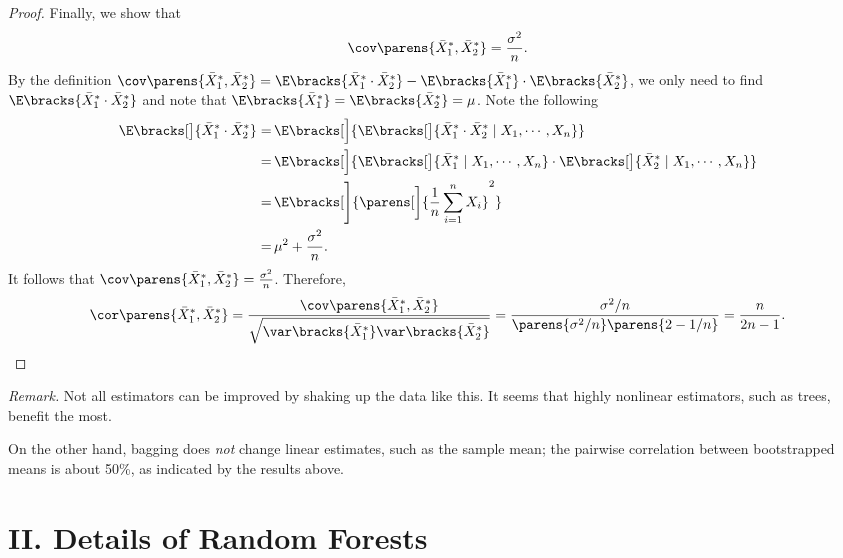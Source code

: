 \documentclass[12pt]{article}
\begin{document}
\begin{enumerate}[label=\textbf{\arabic*.}]
\begin{proof}
	Finally, we show that 
	\begin{align*}
		\cov \parens{\bar{X}^*_1, \bar{X}^*_2} = \frac{\sigma^2}{n}. 
	\end{align*}
	By the definition $\cov \parens{\bar{X}^*_1, \bar{X}^*_2} = \E \bracks{\bar{X}^*_1 \cdot \bar{X}^*_2} - \E \bracks{\bar{X}^*_1} \cdot \E \bracks{\bar{X}^*_2}$, we only need to find $\E \bracks{\bar{X}^*_1 \cdot \bar{X}^*_2}$ and note that $\E \bracks{\bar{X}^*_1} = \E \bracks{\bar{X}^*_2} = \mu$. Note the following 
	\begin{align*}
		\E \bracks[\big]{\bar{X}^*_1 \cdot \bar{X}^*_2} = & \, \E \bracks[\Big]{\E \bracks[\big]{\bar{X}^*_1 \cdot \bar{X}^*_2 \mid X_1, \cdots, X_n}} \\ 
		= & \, \E \bracks[\Big]{\E \bracks[\big]{\bar{X}^*_1 \mid X_1, \cdots, X_n} \cdot \E \bracks[\big]{\bar{X}^*_2 \mid X_1, \cdots, X_n}} \\ 
		= & \, \E \bracks[\Bigg]{\parens[\bigg]{\frac{1}{n}\sum_{i=1}^n X_i}^2} \\ 
		= & \, \mu^2 + \frac{\sigma^2}{n}. 
	\end{align*}
	It follows that $\cov \parens{\bar{X}^*_1, \bar{X}^*_2} = \frac{\sigma^2}{n}$. Therefore, 
	\begin{align*}
		\cor \parens{\bar{X}^*_1, \bar{X}^*_2} = \frac{\cov \parens{\bar{X}^*_1, \bar{X}^*_2}}{\sqrt{\var \bracks{\bar{X}^*_1} \var \bracks{\bar{X}^*_2}}} = \frac{\sigma^2/n}{\parens{\sigma^2/n} \parens{2-1/n}} = \frac{n}{2n-1}. 
	\end{align*}
	\end{proof}
	
	\textit{Remark.} Not all estimators can be improved by shaking up the data like this. It seems that highly nonlinear estimators, such as trees, benefit the most. 
	
	On the other hand, bagging does \emph{not} change linear estimates, such as the sample mean; the pairwise correlation between bootstrapped means is about 50\%, as indicated by the results above. 
	
\end{enumerate}


\section*{II. Details of Random Forests}
\end{document}
